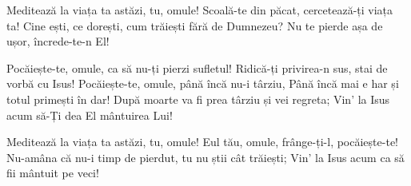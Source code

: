 \beginverse
Meditează la viața ta astăzi, tu, omule!
Scoală-te din păcat, cercetează-ți viața ta!
Cine ești, ce dorești, cum trăiești fără de Dumnezeu?
Nu te pierde așa de ușor, încrede-te-n El!
\endverse

\beginchorus
Pocăiește-te, omule, ca să nu-ți pierzi sufletul!
Ridică-ți privirea-n sus, stai de vorbă cu Isus!
Pocăiește-te, omule, până încă nu-i târziu,
Până încă mai e har și totul primești în dar!
După moarte va fi prea târziu și vei regreta;
Vin' la Isus acum să-Ți dea El mântuirea Lui!
\endchorus

\beginverse
Meditează la viața ta astăzi, tu, omule!
Eul tău, omule, frânge-ți-l, pocăiește-te!
Nu-amâna că nu-i timp de pierdut, tu nu știi cât trăiești;
Vin' la Isus acum ca să fii mântuit pe veci!
\endverse
\endsong